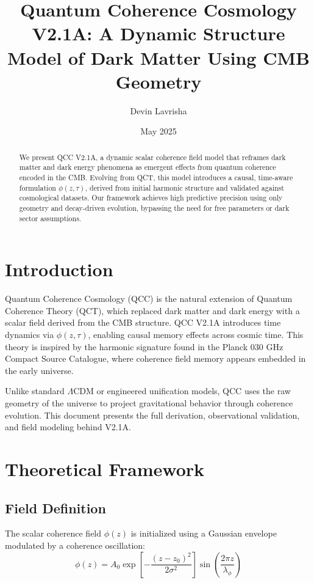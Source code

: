 \documentclass[12pt]{article}
\title{Quantum Coherence Cosmology V2.1A: A Dynamic Structure Model of Dark Matter Using CMB Geometry}
\author[1]{Devin Lavrisha}
\affil[1]{Independent}
\date{May 2025}
\begin{document}
\maketitle

\begin{abstract}
We present QCC V2.1A, a dynamic scalar coherence field model that reframes dark matter and dark energy phenomena as emergent effects from quantum coherence encoded in the CMB. Evolving from QCT, this model introduces a causal, time-aware formulation \( \phi(z, \tau) \), derived from initial harmonic structure and validated against cosmological datasets. Our framework achieves high predictive precision using only geometry and decay-driven evolution, bypassing the need for free parameters or dark sector assumptions.
\end{abstract}

\section{Introduction}
Quantum Coherence Cosmology (QCC) is the natural extension of Quantum Coherence Theory (QCT), which replaced dark matter and dark energy with a scalar field derived from the CMB structure. QCC V2.1A introduces time dynamics via \( \phi(z, \tau) \), enabling causal memory effects across cosmic time. This theory is inspired by the harmonic signature found in the Planck 030 GHz Compact Source Catalogue, where coherence field memory appears embedded in the early universe.

Unlike standard $\Lambda$CDM or engineered unification models, QCC uses the raw geometry of the universe to project gravitational behavior through coherence evolution. This document presents the full derivation, observational validation, and field modeling behind V2.1A.

\section{Theoretical Framework}
\subsection{Field Definition}
The scalar coherence field \( \phi(z) \) is initialized using a Gaussian envelope modulated by a coherence oscillation:
\begin{equation}
\phi(z) = A_0 \exp\left[-\frac{(z - z_0)^2}{2\sigma^2}\right] \sin\left(\frac{2\pi z}{\lambda_\phi}\right)
\end{equation}
\end{document}
